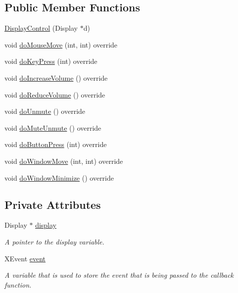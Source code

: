 \subsection*{Public Member Functions}
\begin{DoxyCompactItemize}
\item 
\hyperlink{class_gestro_1_1_display_control_a4d2a5053b250bbd1f3103795cb29fcde}{Display\+Control} (Display $\ast$d)
\item 
void \hyperlink{class_gestro_1_1_display_control_aa8c509a1e17ba12d164dcfe43cf281d4}{do\+Mouse\+Move} (int, int) override
\item 
void \hyperlink{class_gestro_1_1_display_control_aa5af48425f7ba40012b2a7db5fabed45}{do\+Key\+Press} (int) override
\item 
void \hyperlink{class_gestro_1_1_display_control_a8a361b4c25ef55b86b5c2d178ffa516f}{do\+Increase\+Volume} () override
\item 
void \hyperlink{class_gestro_1_1_display_control_a874fa3f6b3e4cf465db62a4eba1c1dd1}{do\+Reduce\+Volume} () override
\item 
void \hyperlink{class_gestro_1_1_display_control_a210411b559d8c3ffb1498f49cfa26a6d}{do\+Unmute} () override
\item 
void \hyperlink{class_gestro_1_1_display_control_a25f685ea6bf001e53c7d17410f2a24ea}{do\+Mute\+Unmute} () override
\item 
void \hyperlink{class_gestro_1_1_display_control_a5f45c36e699afa1d56b2af78e5125aca}{do\+Button\+Press} (int) override
\item 
void \hyperlink{class_gestro_1_1_display_control_aca4208c53cac28e164e7949effdc04cd}{do\+Window\+Move} (int, int) override
\item 
void \hyperlink{class_gestro_1_1_display_control_ad5fa763a77c680ce7b2089c6d79c4eb7}{do\+Window\+Minimize} () override
\end{DoxyCompactItemize}
\subsection*{Private Attributes}
\begin{DoxyCompactItemize}
\item 
Display $\ast$ \hyperlink{class_gestro_1_1_display_control_a6a6844fa13ff67a20596cacd8c5c52d8}{display}
\begin{DoxyCompactList}\small\item\em A pointer to the display variable. \end{DoxyCompactList}\item 
X\+Event \hyperlink{class_gestro_1_1_display_control_a1bf9a5a6abafb845fe5bbeb7e84f715d}{event}
\begin{DoxyCompactList}\small\item\em A variable that is used to store the event that is being passed to the callback function. \end{DoxyCompactList}\end{DoxyCompactItemize}



